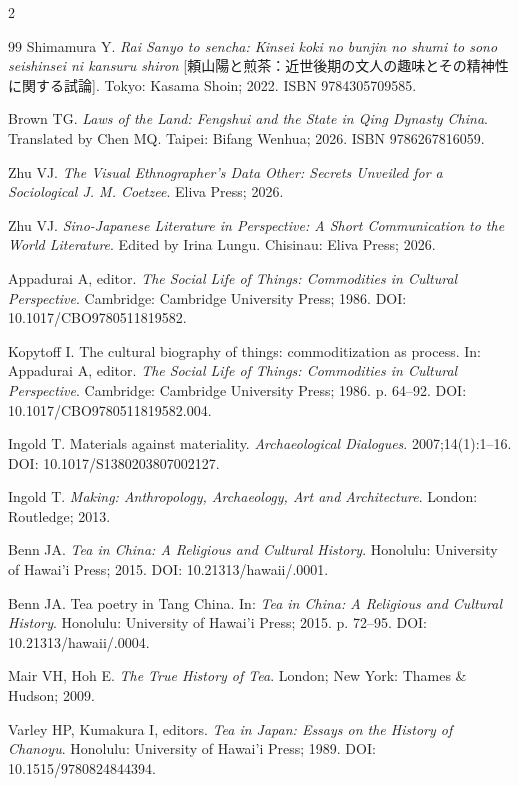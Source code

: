 \documentclass[numbers]{IntechOpen-Book}
\newcommand{\zh}[1]{{\CJKfontspec{Noto Serif CJK SC}\upshape #1}}
\begin{document}
\begin{backmatter}
\begin{multicols}{2}
\begin{thebibliography}{99}
 Shimamura Y. \textit{Rai Sanyo to sencha: Kinsei koki no bunjin no shumi to sono seishinsei ni kansuru shiron} [\zh{頼山陽と煎茶：近世後期の文人の趣味とその精神性に関する試論}]. Tokyo: Kasama Shoin; 2022. ISBN 9784305709585.

 Brown TG. \textit{Laws of the Land: Fengshui and the State in Qing Dynasty China}. Translated by Chen MQ. Taipei: Bifang Wenhua; 2026. ISBN 9786267816059.

 Zhu VJ. \textit{The Visual Ethnographer's Data Other: Secrets Unveiled for a Sociological J. M. Coetzee}. Eliva Press; 2026.

 Zhu VJ. \textit{Sino-Japanese Literature in Perspective: A Short Communication to the World Literature}. Edited by Irina Lungu. Chisinau: Eliva Press; 2026.

 Appadurai A, editor. \textit{The Social Life of Things: Commodities in Cultural Perspective}. Cambridge: Cambridge University Press; 1986. DOI: 10.1017/CBO9780511819582.

 Kopytoff I. The cultural biography of things: commoditization as process. In: Appadurai A, editor. \textit{The Social Life of Things: Commodities in Cultural Perspective}. Cambridge: Cambridge University Press; 1986. p. 64--92. DOI: 10.1017/CBO9780511819582.004.

 Ingold T. Materials against materiality. \textit{Archaeological Dialogues}. 2007;14(1):1--16. DOI: 10.1017/S1380203807002127.

 Ingold T. \textit{Making: Anthropology, Archaeology, Art and Architecture}. London: Routledge; 2013.

 Benn JA. \textit{Tea in China: A Religious and Cultural History}. Honolulu: University of Hawai'i Press; 2015. DOI: 10.21313/hawaii/.0001.

 Benn JA. Tea poetry in Tang China. In: \textit{Tea in China: A Religious and Cultural History}. Honolulu: University of Hawai'i Press; 2015. p. 72--95. DOI: 10.21313/hawaii/.0004.

 Mair VH, Hoh E. \textit{The True History of Tea}. London; New York: Thames \& Hudson; 2009.

 Varley HP, Kumakura I, editors. \textit{Tea in Japan: Essays on the History of Chanoyu}. Honolulu: University of Hawai'i Press; 1989. DOI: 10.1515/9780824844394.


\end{thebibliography}
\end{multicols}
\end{backmatter}
\end{document}

